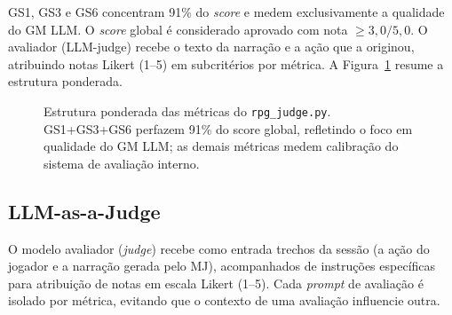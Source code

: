 \documentclass[12pt]{article}
\begin{document}
GS1, GS3 e GS6 concentram 91\% do \textit{score} e medem exclusivamente a qualidade do GM LLM. O \textit{score} global é considerado aprovado com nota $\geq 3{,}0/5{,}0$. O avaliador (LLM-judge) recebe o texto da narração e a ação que a originou, atribuindo notas Likert (1--5) em subcritérios por métrica. A Figura~\ref{fig:metricas} resume a estrutura ponderada.

\begin{figure}[ht]
\centering
{}
\caption{Estrutura ponderada das métricas do \texttt{rpg\_judge.py}. GS1+GS3+GS6 perfazem 91\% do score global, refletindo o foco em qualidade do GM LLM; as demais métricas medem calibração do sistema de avaliação interno.}
\label{fig:metricas}
\end{figure}

\subsection{LLM-as-a-Judge}

O modelo avaliador (\textit{judge}) recebe como entrada trechos da sessão (a ação do jogador e a narração gerada pelo MJ), acompanhados de instruções específicas para atribuição de notas em escala Likert (1--5). Cada \textit{prompt} de avaliação é isolado por métrica, evitando que o contexto de uma avaliação influencie outra.
\end{document}
